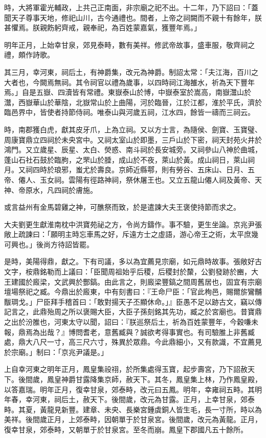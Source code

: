 \begin{pinyinscope}
時，大將軍霍光輔政，上共己正南面，非宗廟之祀不出。十二年，乃下詔曰：「蓋聞天子尊事天地，修祀山川，古今通禮也。間者，上帝之祠闕而不親十有餘年，朕甚懼焉。朕親飭躬齊戒，親奉祀，為百姓蒙嘉氣，獲豐年焉。」

明年正月，上始幸甘泉，郊見泰畤，數有美祥。修武帝故事，盛車服，敬齊祠之禮，頗作詩歌。

其三月，幸河東，祠后土，有神爵集，改元為神爵。制詔太常：「夫江海，百川之大者也，今闕焉無祠。其令祠官以禮為歲事，以四時祠江海雒水，祈為天下豐年焉。」自是五嶽、四瀆皆有常禮。東嶽泰山於博，中嶽泰室於嵩高，南嶽灊山於灊，西嶽華山於華陰，北嶽常山於上曲陽，河於臨晉，江於江都，淮於平氏，濟於臨邑界中，皆使者持節侍祠。唯泰山與河歲五祠，江水四，餘皆一禱而三祠云。

時，南郡獲白虎，獻其皮牙爪，上為立祠。又以方士言，為隨侯、劍寶、玉寶璧、周康寶鼎立四祠於未央宮中。又祠太室山於即墨，三戶山於下密，祠天封苑火井於鴻門。又立歲星、辰星、太白、熒惑、南斗祠於長安城旁。又祠參山八神於曲城，蓬山石社石鼓於臨朐，之罘山於腄，成山於不夜，萊山於黃。成山祠日，萊山祠月。又祠四時於琅邪，蚩尤於壽良。京師近縣鄠，則有勞谷、五床山、日月、五帝、僊人、玉女祠。雲陽有徑路神祠，祭休屠王也。又立五龍山僊人祠及黃帝、天神、帝原水，凡四祠於膚施。

或言益州有金馬碧雞之神，可醮祭而致，於是遣諫大夫王褒使持節而求之。

大夫劉更生獻淮南枕中洪寶苑祕之方，令尚方鑄作。事不驗，更生坐論。京兆尹張敞上疏諫曰：「願明主時忘車馬之好，斥遠方士之虛語，游心帝王之術，太平庶幾可興也。」後尚方待詔皆罷。

是時，美陽得鼎，獻之。下有司議，多以為宜薦見宗廟，如元鼎時故事。張敞好古文字，桉鼎銘勒而上議曰：「臣聞周祖始乎后稷，后稷封於斄，公劉發跡於豳，大王建國於廄梁，文武興於酆鎬。由此言之，則廄梁豐鎬之間周舊居也，固宜有宗廟壇場祭祀之臧。今鼎出於廄東，中有刻書曰：『王命尸臣：「官此栒邑，賜爾旂鸞黼黻琱戈。」尸臣拜手稽首曰：「敢對揚天子丕顯休命。」』臣愚不足以跡古文，竊以傳記言之，此鼎殆周之所以褒賜大臣，大臣子孫刻銘其先功，臧之於宮廟也。昔寶鼎之出於汾脽也，河東太守以聞，詔曰：『朕巡祭后土，祈為百姓蒙豐年，今穀嗛未報，鼎焉為出哉？』博問耆老，意舊臧與？誠欲考得事實也。有司驗脽上非舊臧處，鼎大八尺一寸，高三尺六寸，殊異於眾鼎。今此鼎細小，又有款識，不宜薦見於宗廟。」制曰：「京兆尹議是。」

上自幸河東之明年正月，鳳皇集祋祤，於所集處得玉寶，起步壽宮，乃下詔赦天下。後間歲，鳳皇神爵甘露降集京師，赦天下。其冬，鳳皇集上林，乃作鳳皇殿，以答嘉瑞。明年正月，復幸甘泉，郊泰畤，改元曰五鳳。明年，幸雍祠五畤。其明年春，幸河東，祠后土，赦天下。後間歲，改元為甘露。正月，上幸甘泉，郊泰畤。其夏，黃龍見新豐。建章、未央、長樂宮鍾虡銅人皆生毛，長一寸所，時以為美祥。後間歲正月，上郊泰畤，因朝單于於甘泉宮。後間歲，改元為黃龍。正月，復幸甘泉，郊泰畤，又朝單于於甘泉宮。至冬而崩。鳳皇下郡國凡五十餘所。


\end{pinyinscope}
